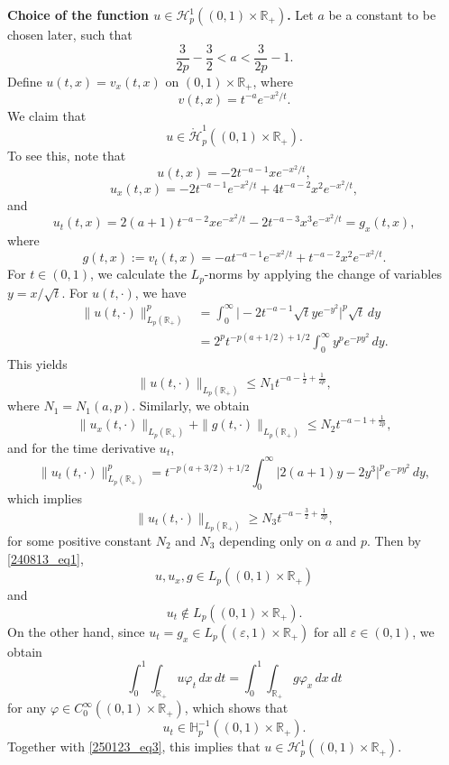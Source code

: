 \documentclass[reqno]{amsart}
\numberwithin{equation}{section}
\theoremstyle{plain}
\theoremstyle{definition}
\def\bR{\mathbb{R}}
\def\bH{\mathbb{H}}
\def\cH{\mathcal{H}}
\begin{document}
\bigskip
\noindent 
\textbf{Choice of the function $u \in \mathcal{H}_p^1((0, 1) \times \bR_+)$.}
Let $a$ be a constant to be chosen later, such that 
\begin{equation}		\label{240813_eq1}
\frac{3}{2p}-\frac{3}{2}< a<\frac{3}{2p}-1.
\end{equation}
Define 
$u(t,x)=v_x(t,x)$
on $(0,1)\times \bR_+$, where 
$$
v(t,x)=t^{-a} e^{-x^2/t}.
$$
We claim that   
$$
u\in \mathring{\cH}^1_{p}((0,1)\times \bR_+).
$$
To see this, note that 
$$
u(t,x)=-2t^{-a-1} x e^{-x^2/t},
$$
$$
u_x(t,x) = -2t^{-a-1}e^{-x^2/t} + 4t^{-a-2}x^2e^{-x^2/t},
$$
and 
\begin{equation}		\label{240813_eq2}
u_t(t,x)=2(a+1)t^{-a-2}xe^{-x^2/t} - 2 t^{-a-3}x^3e^{-x^2/t}=g_x(t,x), 
\end{equation}
where 
$$
g(t,x):=v_t(t,x)=-at^{-a-1}e^{-x^2/t} + t^{-a-2}x^2e^{-x^2/t}.
$$
For $t\in (0,1)$, we calculate the $L_p$-norms by applying the change of variables $y = x/\sqrt{t}$.
For $u(t, \cdot)$, we have
\begin{align*}
    \|u(t, \cdot)\|^p_{L_p(\bR_+)} &= \int_0^\infty \big|-2t^{-a-1} \sqrt{t}y e^{-y^2}\big|^p \sqrt{t} \,dy \\
    &= 2^p t^{-p(a+1/2)+1/2} \int_0^\infty y^p e^{-py^2}\,dy.
\end{align*}
This yields
\begin{equation}		\label{260210_eq2}
\|u(t, \cdot)\|_{L_p(\bR_+)} \le N_1  t^{-a-\frac{1}{2}+\frac{1}{2p}},
\end{equation}
where $N_1 = N_1(a, p)$.
Similarly, we obtain
$$
\|u_x(t, \cdot)\|_{L_p(\bR_+)}+\|g(t, \cdot)\|_{L_p(\bR_+)} \le N_2 t^{-a-1+\frac{1}{2p}},
$$
and for the time derivative $u_t$,
$$
\|u_t(t, \cdot)\|^p_{L_p(\bR_+)} = t^{-p(a+3/2)+1/2} \int_0^\infty \big|2(a+1)y - 2y^3\big|^p e^{-py^2}\,dy,
$$
which implies
$$
\|u_t(t, \cdot)\|_{L_p(\bR_+)} \ge N_3 t^{-a-\frac{3}{2}+\frac{1}{2p}},
$$
for some positive constant $N_2$ and $N_3$ depending only on $a$ and $p$.
Then by \eqref{240813_eq1}, 
\begin{equation}		\label{250123_eq3}
u,  u_x,  g\in L_{p}((0,1)\times \bR_+)
\end{equation}
and
$$
u_t\notin L_{p}((0,1)\times \bR_+).
$$
On the other hand,  since $u_t=g_x\in L_{p}((\varepsilon, 1)\times \bR_+)$ for all $\varepsilon\in (0, 1)$, we obtain
\begin{equation}		\label{240812_C2}
\int_0^1 \int_{\bR_+} u  \varphi_t \,dx\,dt = \int_0^1 \int_{\bR_+} g \varphi_x \,dx\,dt
\end{equation}
for any $\varphi\in C^\infty_0((0,1)\times \bR_+)$, which shows that
$$
u_t\in \bH^{-1}_{p}((0,1)\times \bR_+).
$$
Together with \eqref{250123_eq3}, this implies that $u\in \cH^1_p((0,1)\times \bR_+)$.
\end{document}
